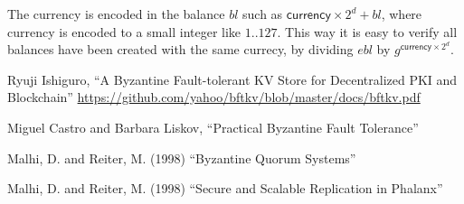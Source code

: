 \documentclass[10pt,fleqn]{article}
\begin{document}
The currency is encoded in the balance $bl$ such as $\textsf{currency} \times 2^d + bl$, where \textsf{currency} is encoded to a small integer like $1..127$. This way it is easy to verify all balances have been created with the same currecy, by dividing $ebl$ by $g^{\textsf{currency} \times 2^d}$.


\begin{thebibliography}{99}

  Ryuji Ishiguro, ``A Byzantine Fault-tolerant KV Store for Decentralized PKI and Blockchain'' \url{https://github.com/yahoo/bftkv/blob/master/docs/bftkv.pdf}

  Miguel Castro and Barbara Liskov, ``Practical Byzantine Fault Tolerance''

  Malhi, D. and Reiter, M. (1998) ``Byzantine Quorum Systems''

  Malhi, D. and Reiter, M. (1998) ``Secure and Scalable Replication in Phalanx''


\end{thebibliography}
\end{document}
